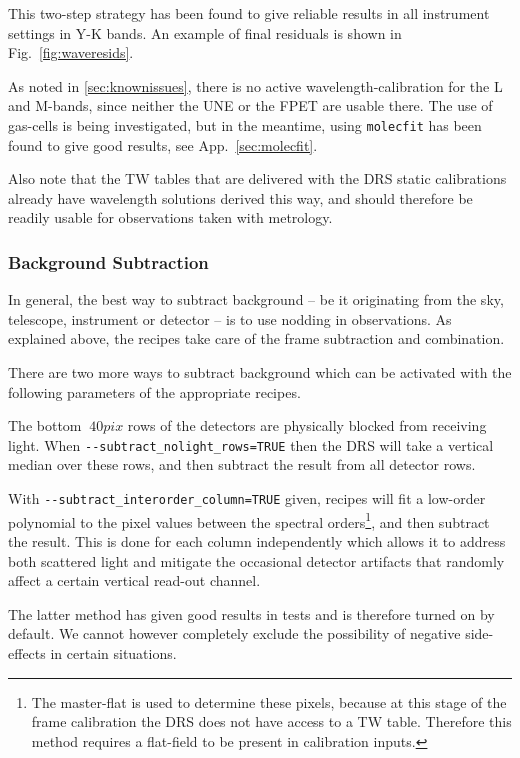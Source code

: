 This two-step strategy has been found to give reliable results in all instrument
settings in Y-K bands. An example of final residuals is shown in
Fig.~\ref{fig:waveresids}.

As noted in \ref{sec:knownissues}, there is no active wavelength-calibration for
the L and M-bands, since neither the UNE or the FPET are usable there. The use
of gas-cells is being investigated, but in the meantime, using \verb!molecfit!
has been found to give good results, see App.~\ref{sec:molecfit}.

Also note that the TW tables that are delivered with the DRS static calibrations
already have wavelength solutions derived this way, and should therefore be
readily usable for observations taken with metrology.


\subsubsection{Background Subtraction}
\label{sec:backgr}

In general, the best way to subtract background  --  be it originating from the
sky, telescope, instrument or detector  --  is to use nodding in observations.
As explained above, the recipes take care of the frame subtraction and
combination.

There are two more ways to subtract background which can be activated with the
following parameters of the appropriate recipes.

The bottom $~40pix$ rows of the detectors are physically blocked from receiving
light. When \linebreak\verb!--subtract_nolight_rows=TRUE! then the DRS will take a
vertical median over these rows, and then subtract the result from all detector
rows.

With \verb!--subtract_interorder_column=TRUE! given, recipes will fit a
low-order polynomial to the pixel values between the spectral
orders\footnote{The master-flat is used to determine these pixels, because at
this stage of the frame calibration the DRS does not have access to a TW table.
Therefore this method requires a flat-field to be present in calibration
inputs.}, and then subtract the result. This is done for each column
independently which allows it to address both scattered light and mitigate the
occasional detector artifacts that randomly affect a certain vertical read-out
channel.

The latter method has given good results in tests and is therefore turned on by
default. We cannot however completely exclude the possibility of negative
side-effects in certain situations.

